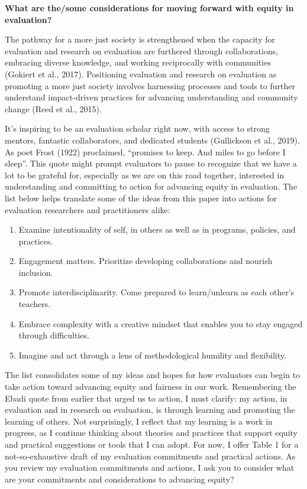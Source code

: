 \documentclass[
]{book}
\begin{document}
\textbf{What are the/some considerations for moving forward with equity in evaluation?}

The pathway for a more just society is strengthened when the capacity for evaluation and research on evaluation are furthered through collaborations, embracing diverse knowledge, and working reciprocally with communities (Gokiert et al., 2017). Positioning evaluation and research on evaluation as promoting a more just society involves harnessing processes and tools to further understand impact-driven practices for advancing understanding and community change (Reed et al., 2015).

It's inspiring to be an evaluation scholar right now, with access to strong mentors, fantastic collaborators, and dedicated students (Gullickson et al., 2019). As poet Frost (1922) proclaimed, ``promises to keep. And miles to go before I sleep''. This quote might prompt evaluators to pause to recognize that we have a lot to be grateful for, especially as we are on this road together, interested in understanding and committing to action for advancing equity in evaluation. The list below helps translate some of the ideas from this paper into actions for evaluation researchers and practitioners alike:

\begin{enumerate}
\def\labelenumi{\arabic{enumi}.}
\item
  Examine intentionality of self, in others as well as in programs, policies, and practices.
\item
  Engagement matters. Prioritize developing collaborations and nourish inclusion.
\item
  Promote interdisciplinarity. Come prepared to learn/unlearn as each other's teachers.
\item
  Embrace complexity with a creative mindset that enables you to stay engaged through difficulties.
\item
  Imagine and act through a lens of methodological humility and flexibility.
\end{enumerate}

The list consolidates some of my ideas and hopes for how evaluators can begin to take action toward advancing equity and fairness in our work. Remembering the Ebadi quote from earlier that urged us to action, I must clarify: my action, in evaluation and in research on evaluation, is through learning and promoting the learning of others. Not surprisingly, I reflect that my learning is a work in progress, as I continue thinking about theories and practices that support equity and practical suggestions or tools that I can adopt. For now, I offer Table 1 for a not-so-exhaustive draft of my evaluation commitments and practical actions. As you review my evaluation commitments and actions, I ask you to consider what are your commitments and considerations to advancing equity?
\end{document}
